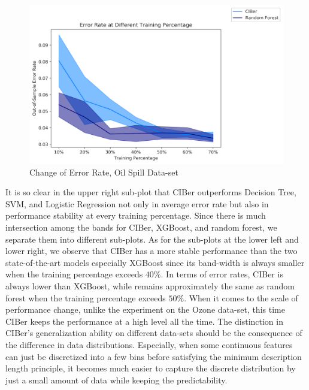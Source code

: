 \documentclass[twoside,11pt]{article}
\begin{document}
\begin{figure}[ht]
\begin{minipage}[b]{0.5\linewidth}
  \end{minipage}
  \begin{minipage}[b]{0.5\linewidth}
    \centering
    \includegraphics[width=0.9\linewidth]{Figures/Empirical/err_change_oil_rf.png}
  \end{minipage} 
  \caption{Change of Error Rate, Oil Spill Data-set} 
  \label{Fig_oil_spill}
\end{figure}

It is so clear in the upper right sub-plot that CIBer outperforms Decision Tree, SVM, and Logistic Regression not only in average error rate but also in performance stability at every training percentage. Since there is much intersection among the bands for CIBer, XGBoost, and random forest, we separate them into different sub-plots. As for the sub-plots at the lower left and lower right, we observe that CIBer has a more stable performance than the two state-of-the-art models especially XGBoost since its band-width is always smaller when the training percentage exceeds $40\%$. In terms of error rates, CIBer is always lower than XGBoost, while remains approximately the same as random forest when the training percentage exceeds $50\%$. When it comes to the scale of performance change, unlike the experiment on the Ozone data-set, this time CIBer keeps the performance at a high level all the time. The distinction in CIBer's generalization ability on different data-sets should be the consequence of the difference in data distributions. Especially, when some continuous features can just be discretized into a few bins before satisfying the minimum description length principle, it becomes much easier to capture the discrete distribution by just a small amount of data while keeping the predictability. 
\end{document}
